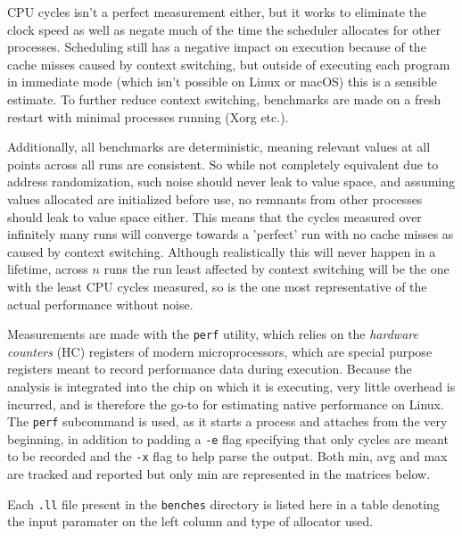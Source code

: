 \documentclass{article}
\begin{document}
CPU cycles isn't a perfect measurement either, but it works to eliminate the clock speed as well as negate much of the time the scheduler allocates for other processes. Scheduling still has a negative impact on execution because of the cache misses caused by context switching, but outside of executing each program in immediate mode (which isn't possible on Linux or macOS) this is a sensible estimate. To further reduce context switching, benchmarks are made on a fresh restart with minimal processes running (Xorg etc.).

Additionally, all benchmarks are deterministic, meaning relevant values at all points across all runs are consistent.
So while not completely equivalent due to address randomization, such noise should never leak to value space, and assuming values allocated are initialized before use, no remnants from other processes should leak to value space either.  %
This means that the cycles measured over infinitely many runs will converge towards a 'perfect' run with no cache misses as caused by context switching.
Although realistically this will never happen in a lifetime, across \(n\) runs the run least affected by context switching will be the one with the least CPU cycles measured, so is the one most representative of the actual performance without noise.

Measurements are made with the \lstinline!perf! utility, which relies on the \textit{hardware counters} (HC) registers of modern microprocessors, which are special purpose registers meant to record performance data during execution. Because the analysis is integrated into the chip on which it is executing, very little overhead is incurred, and is therefore the go-to for estimating native performance on Linux. The \lstinline!perf! subcommand is used, as it starts a process and attaches from the very beginning, in addition to padding a \lstinline!-e! flag specifying that only cycles are meant to be recorded and the \lstinline!-x! flag to help parse the output. Both min, avg and max are tracked and reported but only min are represented in the matrices below.

Each \lstinline!.ll! file present in the \lstinline!benches! directory is listed here in a table denoting the input paramater on the left column and type of allocator used.

\end{document}
